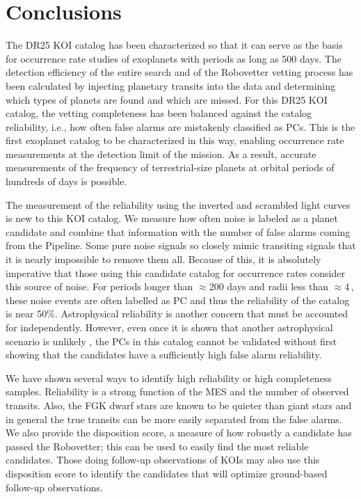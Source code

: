 

\section{Conclusions}
\label{s:conclusions}

The DR25 KOI catalog has been characterized so that it can serve as the basis for occurrence rate studies of exoplanets with periods as long as 500 days. The detection efficiency of the entire search \citep{Burke2017b,Christiansen2017} and of the Robovetter vetting process \citep{Coughlin2017a} has been calculated by injecting planetary transits into the data and determining which types of planets are found and which are missed. For this DR25 KOI catalog, the vetting completeness has been balanced against the catalog reliability, i.e., how often false alarms are mistakenly classified as PCs. This is the first \Kepler{} exoplanet catalog to be characterized in this way, enabling occurrence rate measurements at the detection limit of the mission.  As a result, accurate measurements of the frequency of terrestrial-size planets at orbital periods of hundreds of days is possible.

The measurement of the reliability using the inverted and scrambled light curves is new to this KOI catalog. We measure how often noise is labeled as a planet candidate and combine that information with the number of false alarms coming from the \Kepler{} Pipeline. Some pure noise signals so closely mimic transiting signals that it is nearly impossible to remove them all. Because of this, it is absolutely imperative that those using this candidate catalog for occurrence rates consider this source of noise. For periods longer than $\approx$200 days and radii less than $\approx$4\,\Rearth, these noise events are often labelled as PC and thus the reliability of the catalog is near 50\%.  Astrophysical reliability is another concern that must be accounted for independently.  However, even once it is shown that another astrophysical scenario is unlikely \citep[as was done for the DR24 KOIs in][]{Morton2016}, the PCs in this catalog cannot be validated without first showing that the candidates have a sufficiently high false alarm reliability. 

We have shown several ways to identify high reliability or high completeness samples. Reliability is a strong function of the MES and the number of observed transits. Also, the FGK dwarf stars are known to be quieter than giant stars and in general the true transits can be more easily separated from the false alarms. We also provide the disposition score, a measure of how robustly a candidate has passed the Robovetter; this can be used to easily find the most reliable candidates. Those doing follow-up observations of KOIs may also use this disposition score to identify the candidates that will optimize ground-based follow-up observations.  

